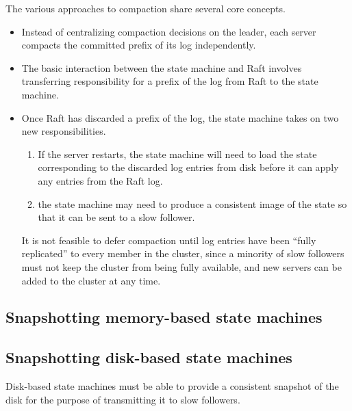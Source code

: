 \documentclass[11pt]{article}
\begin{document}
The various approaches to compaction share several core concepts.
\begin{itemize}
\item Instead of centralizing compaction decisions on the leader, each server compacts the committed
prefix of its log independently.
\item The basic interaction between the state machine and Raft involves transferring responsibility for a
prefix of the log from Raft to the state machine.
\item Once Raft has discarded a prefix of the log, the state machine takes on two new responsibilities.
\begin{enumerate}
\item If the server restarts, the state machine will need to load the state corresponding to the
discarded log entries from disk before it can apply any entries from the Raft log.
\item the state machine may need to produce a consistent image of the state so that it can be sent to a
slow follower.
\end{enumerate}
It is not feasible to defer compaction until log entries have been “fully replicated” to every
member in the cluster, since a minority of slow followers must not keep the cluster from being
fully available, and new servers can be added to the cluster at any time.
\end{itemize}
\subsection{Snapshotting memory-based state machines}
\label{sec:org93b5ad1}
\subsection{Snapshotting disk-based state machines}
\label{sec:orgf9ed8f2}
Disk-based state machines must be able to provide a consistent snapshot of the disk for the purpose of
transmitting it to slow followers.
\end{document}
